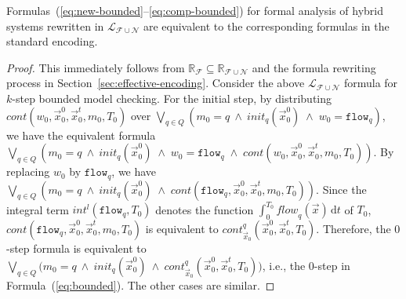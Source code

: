 \begin{theorem}
Formulas~(\ref{eq:new-bounded}--\ref{eq:comp-bounded})
for formal analysis of hybrid systems rewritten in $\mathcal{L}_{\mathcal{F}\cup\mathcal{N}}$ 
are equivalent to the corresponding formulas in the standard encoding.%


\end{theorem}

\begin{proof}
This immediately follows from 
$\mathbb{R}_\mathcal{F} \subseteq \mathbb{R}_{\mathcal{F}\cup\mathcal{N}}$ and
the formula rewriting process in Section~\ref{sec:effective-encoding}.
Consider the above 
$\mathcal{L}_{\mathcal{F}\cup\mathcal{N}}$ formula for $k$-step bounded model checking.
For the initial step, by distributing %
$\mathit{cont}(w_0, \vec{x}_0^0, \vec{x}_0^t, m_0, T_0)$
over %
$\bigvee_{q \in Q}
(m_0 = q 
\:\wedge\:
\mathit{init}_q(\vec{x}_0^0) 
\;\wedge\;
w_0 = \texttt{flow}_q)$,
we have the equivalent formula
$\bigvee_{q \in Q}
(m_0 = q 
\:\wedge\:
\mathit{init}_q(\vec{x}_0^0) 
\;\wedge\;
w_0 = \texttt{flow}_q
\;\wedge\;
\mathit{cont}(w_0, \vec{x}_0^0, \vec{x}_0^t, m_0, T_0))$.
By replacing %
$w_0$ by $\texttt{flow}_q$, we have
$\bigvee_{q \in Q}
(m_0 = q 
\:\wedge\:
\mathit{init}_q(\vec{x}_0^0) 
\;\wedge\;
\mathit{cont}(\texttt{flow}_q, \vec{x}_0^0, \vec{x}_0^t, m_0, T_0))$.
%
Since the integral term $\mathit{int}^l(\texttt{flow}_q, T_0)$
denotes the function $\int_0^{T_0} \mathit{flow}_q(\vec{x})\,\mathrm{d}t$ of $T_0$,
 $\mathit{cont}(\texttt{flow}_q, \vec{x}_0^0, \vec{x}_0^t, m_0, T_0)$
is equivalent to $\mathit{cont}_{\vec{x}_0}^q(\vec{x}_0^0, \vec{x}_0^t, T_0)$.
Therefore,
the $0$-step formula
is equivalent to
$\bigvee_{q \in Q}
\big(
m_0 = q 
\:\wedge\:
\mathit{init}_q(\vec{x}_0^0) 
\:\wedge\:
\mathit{cont}_{\vec{x}_0}^q(\vec{x}_0^0, \vec{x}_0^t, T_0)\big)$,
i.e., the $0$-step in Formula~(\ref{eq:bounded}).
The other cases are similar.
\end{proof}


